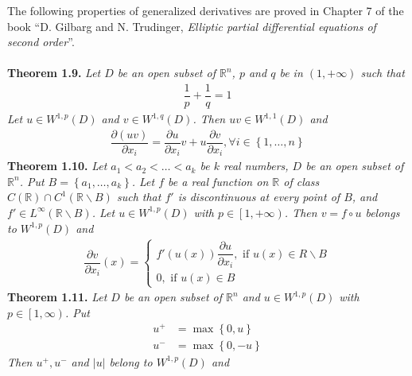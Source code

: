 \documentclass[a4paper]{article}
\numberwithin{equation}{section}
\begin{document}
The following properties of generalized derivatives are proved in Chapter 7 of the book ``D. Gilbarg and N. Trudinger, \textit{Elliptic partial differential equations of second order}''.\\
\\
\textbf{Theorem 1.9.} \textit{Let $D$ be an open subset of $\mathbb{R}^n$, $p$ and $q$ be in $\left(1,+\infty \right)$ such that}
\begin{align}
\dfrac{1}{p} + \dfrac{1}{q} = 1
\end{align}
\textit{Let $u\in W^{1,p}\left(D\right)$ and $v\in W^{1,q}\left(D\right)$. Then $uv \in W^{1,1}\left(D\right)$ and}
\begin{align}
\dfrac{{\partial \left( {uv} \right)}}{{\partial {x_i}}} = \dfrac{{\partial u}}{{\partial {x_i}}}v + u\dfrac{{\partial v}}{{\partial {x_i}}},\forall i \in \left\{ {1, \ldots ,n} \right\}
\end{align}
\textbf{Theorem 1.10.} \textit{Let $a_1<a_2<\ldots<a_k$ be $k$ real numbers, $D$ be an open subset of $\mathbb{R}^n$. Put $B=\left\{a_1,\ldots,a_k\right\}$. Let $f$ be a real function on $\mathbb{R}$ of class $C\left( \mathbb{R} \right) \cap {C^1}\left( {\mathbb{R}\backslash B} \right)$ such that $f'$ is discontinuous at every point of $B$, and $f' \in L^{\infty}\left(\mathbb{R}\backslash B\right)$. Let $u\in W^{1,p}\left(D\right)$ with $p\in \left[1,+\infty\right)$. Then $v = f \circ u$ belongs to $W^{1,p}\left(D\right)$ and}
\begin{align}
\dfrac{{\partial v}}{{\partial {x_i}}}\left( x \right) = \left\{ {\begin{array}{*{20}{c}}
{f'\left( {u\left( x \right)} \right)\dfrac{{\partial u}}{{\partial {x_i}}},\mbox{ if } u\left( x \right) \in R\backslash B}\\
{0,\mbox{ if } u\left( x \right) \in B}
\end{array}} \right.
\end{align}
\textbf{Theorem 1.11.} \textit{Let $D$ be an open subset of $\mathbb{R}^n$ and $u\in W^{1,p}\left(D\right)$ with $p\in \left[1,\infty\right)$. Put}
\begin{align}
{u^ + } &= \max \left\{ {0,u} \right\}\\
{u^ - } &= \max \left\{ {0, - u} \right\}
\end{align}
\textit{Then $u^+,u^-$ and $\left|u\right|$ belong to $W^{1,p}\left(D\right)$ and}
\end{document}
